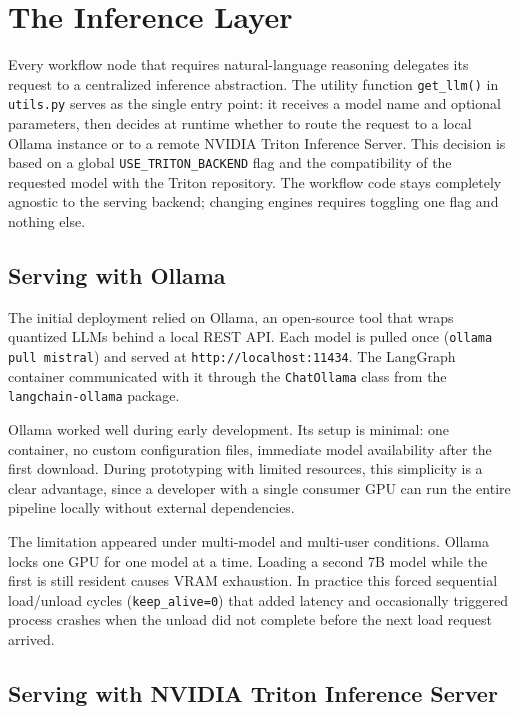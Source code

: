 \section{The Inference Layer}
\label{sec:inference_infrastructure}

Every workflow node that requires natural-language reasoning delegates its request to a centralized inference abstraction. The utility function \texttt{get\_llm()} in \texttt{utils.py} serves as the single entry point: it receives a model name and optional parameters, then decides at runtime whether to route the request to a local Ollama instance or to a remote NVIDIA Triton Inference Server. This decision is based on a global \texttt{USE\_TRITON\_BACKEND} flag and the compatibility of the requested model with the Triton repository. The workflow code stays completely agnostic to the serving backend; changing engines requires toggling one flag and nothing else.

\subsection{Serving with Ollama}

The initial deployment relied on Ollama, an open-source tool that wraps quantized LLMs behind a local REST API. Each model is pulled once (\texttt{ollama pull mistral}) and served at \texttt{http://localhost:11434}. The LangGraph container communicated with it through the \texttt{ChatOllama} class from the \texttt{langchain-ollama} package.

Ollama worked well during early development. Its setup is minimal: one container, no custom configuration files, immediate model availability after the first download. During prototyping with limited resources, this simplicity is a clear advantage, since a developer with a single consumer GPU can run the entire pipeline locally without external dependencies.

The limitation appeared under multi-model and multi-user conditions. Ollama locks one GPU for one model at a time. Loading a second 7B model while the first is still resident causes VRAM exhaustion. In practice this forced sequential load/unload cycles (\texttt{keep\_alive=0}) that added latency and occasionally triggered process crashes when the unload did not complete before the next load request arrived.

\subsection{Serving with NVIDIA Triton Inference Server}


